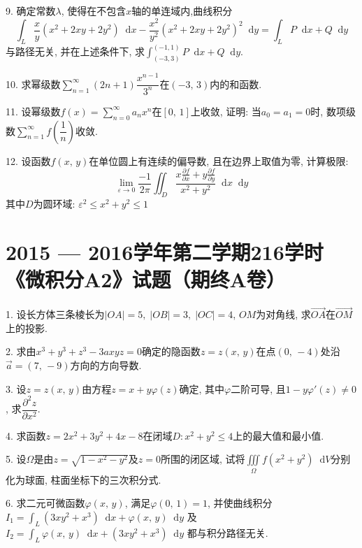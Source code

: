 \documentclass{article}
\newcommand*{\dif}{\mathop{}\!\mathrm{d}}
\begin{document}
9. 确定常数$\lambda$, 使得在不包含$x$轴的单连域内,曲线积分
$$\int_L{\frac{x}{y}(x^2+2xy+2y^2) \dif x -\frac{x^2}{y^2}(x^2+2xy+2y^2)^2 \dif y} = \int_L{P \dif x + Q\dif y}$$
与路径无关, 并在上述条件下, 求$\displaystyle\int_{(-3,3)}^{(-1,1)}{P \dif x + Q \dif y}$.\par

10. 求幂级数$\displaystyle\sum\limits_{n=1}^\infty{(2n+1)\dfrac{x^{n-1}}{3^n}}$在$(-3,\,3)$内的和函数.\par

11. 设幂级数$f(x)=\displaystyle\sum\limits_{n=0}^\infty{a_nx^n}$在$[0,\,1]$上收敛, 证明: 当$a_0=a_1=0$时, 数项级数$\displaystyle\sum\limits_{n=1}^\infty{f\left(\dfrac{1}{n}\right)}$收敛.\par

12. 设函数$f(x,\,y)$在单位圆上有连续的偏导数, 且在边界上取值为零, 计算极限:
$$\lim_{\varepsilon \to 0}{\frac{-1}{2\pi}\iint_D{\frac{x\frac{\partial f}{\partial x}+y\frac{\partial f}{\partial y}}{x^2+y^2} \dif x \dif y}}$$
其中$D$为圆环域: $\varepsilon^2\leqslant x^2+y^2\leqslant 1$

\newpage

\section*{2015 --- 2016学年第二学期216学时《微积分A2》试题（期终A卷）}
1. 设长方体三条棱长为$|OA|=5,\;|OB|=3,\;|OC|=4$, $OM$为对角线, 求$\overrightarrow{OA}$在$\overrightarrow{OM}$上的投影.\par

2. 求由$x^3+y^3+z^3-3axyz = 0$确定的隐函数$z = z(x,\,y)$在点$(0,\,-4)$处沿$\vec{a}=(7,\,-9)$方向的方向导数.\par

3. 设$z=z(x,\,y)$由方程$z=x+y\varphi(z)$确定, 其中$\varphi$二阶可导, 且$1-y\varphi'(z) \neq 0$, 求$\dfrac{\partial^2 z}{\partial x^2}$.\par

4. 求函数$z=2x^2+3y^2+4x-8$在闭域$D: x^2+y^2 \leqslant 4$上的最大值和最小值.\par

5. 设$\Omega$是由$z=\sqrt{1-x^2-y^2}$及$z=0$所围的闭区域, 试将$\displaystyle\iiint\limits_\Omega{f(x^2+y^2) \dif V}$分别化为球面, 柱面坐标下的三次积分式.\par

6. 求二元可微函数$\varphi(x,\,y)$, 满足$\varphi(0,\,1) = 1$, 并使曲线积分$I_1= \displaystyle\int_L{(3x y^2 +x^3)\dif x + \varphi(x,\,y) \dif y}$ 及\\
$I_2= \displaystyle\int_L{\varphi(x,\,y) \dif x+(3x y^2 + x^3) \dif y}$ 都与积分路径无关.\par
\end{document}

